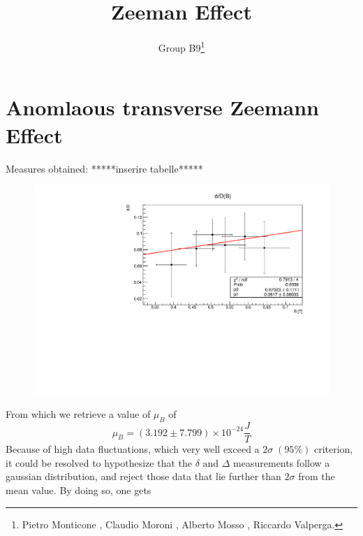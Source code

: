 \documentclass[a4paper,12pt,abstracton]{scrartcl}
\title{Zeeman Effect}
\author{Group B9\footnote{Pietro Monticone , Claudio Moroni , Alberto Mosso , Riccardo Valperga.}}
\begin{document}
\maketitle
\makenomenclature
\tableofcontents
\newpage
\section{Anomlaous transverse Zeemann Effect}
Measures obtained:\newline
*****inserire tabelle*****
\begin{figure}[H]
\centering
\hspace*{-1.5cm}    
\includegraphics[trim=0cm 0cm 1.5cm 0cm,clip,width=17cm,keepaspectratio]{zat.pdf}
\end{figure}
From which we retrieve a value of $\mu_B$ of
\begin{equation*}
\mu_B =(3.192 \pm 7.799 )\times 10^{-24} \frac{J}{T}
\end{equation*}
Because of high data fluctuations, which very well exceed a $2 \sigma \; (95\% )$  criterion, it could be resolved to hypothesize that the $\delta \text{ and } \Delta $ measurements follow a gaussian distribution, and reject those data that lie further than $2 \sigma$ from the mean value. By doing so, one gets\newline
\begin{table}[H]
\centering
{}
\end{table}
\end{document}
